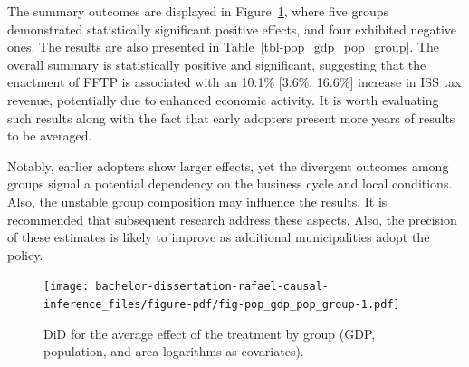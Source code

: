 \documentclass[12pt, a4paper, twoside]{article}
\numberwithin{equation}{subsection} %
\begin{document}
The summary outcomes are displayed in
Figure~\ref{fig-pop_gdp_pop_group}, where five groups demonstrated
statistically significant positive effects, and four exhibited negative
ones. The results are also presented in
Table~\ref{tbl-pop_gdp_pop_group}. The overall summary is statistically
positive and significant, suggesting that the enactment of FFTP is
associated with an 10.1\% {[}3.6\%, 16.6\%{]} increase in ISS tax
revenue, potentially due to enhanced economic activity. It is worth
evaluating such results along with the fact that early adopters present
more years of results to be averaged.

Notably, earlier adopters show larger effects, yet the divergent
outcomes among groups signal a potential dependency on the business
cycle and local conditions. Also, the unstable group composition may
influence the results. It is recommended that subsequent research
address these aspects. Also, the precision of these estimates is likely
to improve as additional municipalities adopt the policy.

\begin{figure}[H]

{\centering \texttt{[image: bachelor-dissertation-rafael-causal-inference\_files/figure-pdf/fig-pop\_gdp\_pop\_group-1.pdf]}

}

\caption{\label{fig-pop_gdp_pop_group}DiD for the average effect of the
treatment by group (GDP, population, and area logarithms as
covariates).}

\end{figure}
\end{document}
